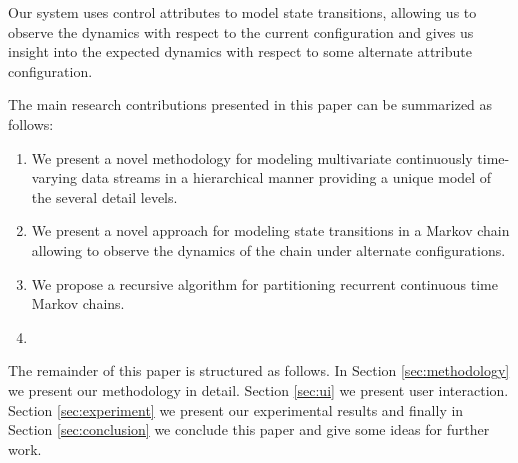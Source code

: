 Our system uses control attributes to model state transitions, allowing us to observe
the dynamics with respect to the current configuration and gives us insight into the
expected dynamics with respect to some alternate attribute configuration.

The main research contributions presented in this paper can be summarized as follows:
\begin{enumerate}{}
  \item We present a novel methodology for modeling multivariate continuously time-varying data streams
  in a hierarchical manner providing a unique model of the several detail levels.
  \item We present a novel approach for modeling state transitions in a Markov chain allowing
  to observe the dynamics of the chain under alternate configurations.
  \item We propose a recursive algorithm for partitioning recurrent continuous time Markov chains.
  \item {}
\end{enumerate}



The remainder of this paper is structured as follows. In Section \ref{sec:methodology} we present
our methodology in detail. Section \ref{sec:ui} we present user interaction. Section \ref{sec:experiment}
we present our experimental results and finally in Section \ref{sec:conclusion} we conclude this
paper and give some ideas for further work.


